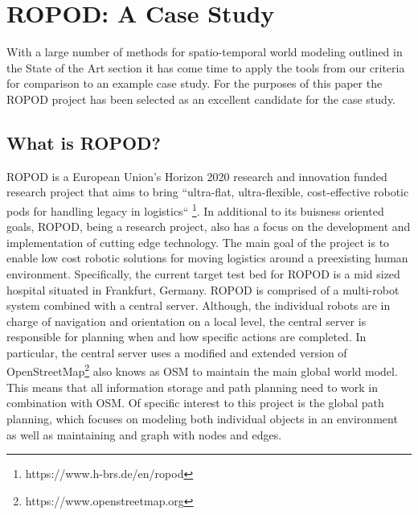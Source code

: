 

  \chapter{ROPOD: A Case Study}

  With a large number of methods for spatio-temporal world modeling outlined
  in the State of the Art section it has come time to apply the tools
  from our criteria for comparison to an example case study. For the
  purposes of this paper the ROPOD project has been selected as an excellent
  candidate for the case study. \\

  \section{ What is ROPOD? }

  ROPOD is a European Union's Horizon 2020 research and innovation funded
  research project that aims to bring ``ultra-flat, ultra-flexible,
  cost-effective robotic pods for handling legacy in logistics``
  \footnote[1]{https://www.h-brs.de/en/ropod}. In additional to its buisness
  oriented goals, ROPOD, being a research project, also has a focus on the
  development and implementation of cutting edge technology.  The main goal of
  the project is to enable low cost robotic solutions for moving logistics
  around a preexisting human environment. Specifically, the current target
  test bed for ROPOD is a mid sized hospital situated in Frankfurt, Germany.
  ROPOD is comprised of a multi-robot system combined with a central server.
  Although, the individual robots are in charge of navigation and orientation
  on a local level, the central server is responsible for planning when and
  how specific actions are completed. In particular, the central server uses a
  modified and extended version of
  OpenStreetMap\footnote[2]{https://www.openstreetmap.org} also knows as OSM to
  maintain the main global world model.
  This means that all information storage and path planning need to work in
  combination with OSM. Of specific interest to this project is the global path
  planning, which focuses on modeling both individual objects in an
  environment as well as maintaining and graph with nodes and edges. \\


